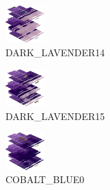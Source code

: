 \hspace{0.1cm}
\begin{minipage}[b]{0.15\linewidth}
\begin{figure}[H]                                                          
  \centering                                                             
  \begin{adjustbox}{width=1.5cm,center}                                   
  \includegraphics[width=1.5cm]{src/colorspace_colourflow/flows/colourflow_94-45.png}%
  \end{adjustbox}                                                        
\caption*{DARK\_LAVENDER14}                                           
\end{figure}                                                               
\end{minipage}
\hspace{0.1cm}
\begin{minipage}[b]{0.15\linewidth}
\begin{figure}[H]                                                          
  \centering                                                             
  \begin{adjustbox}{width=1.5cm,center}                                   
  \includegraphics[width=1.5cm]{src/colorspace_colourflow/flows/colourflow_95-45.png}%
  \end{adjustbox}                                                        
\caption*{DARK\_LAVENDER15}                                           
\end{figure}                                                               
\end{minipage}
\hspace{0.1cm}
\begin{minipage}[b]{0.15\linewidth}
\begin{figure}[H]                                                          
  \centering                                                             
  \begin{adjustbox}{width=1.5cm,center}                                   
  \includegraphics[width=1.5cm]{src/colorspace_colourflow/flows/colourflow_96-45.png}%
  \end{adjustbox}                                                        
\caption*{COBALT\_BLUE0}                                           
\end{figure}                                                               
\end{minipage}
